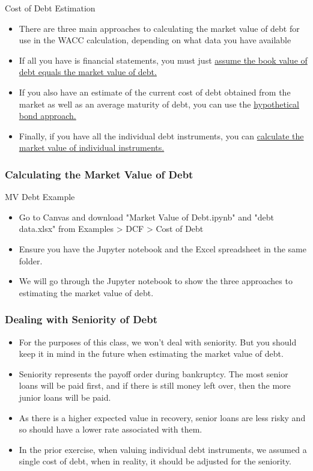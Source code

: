 \documentclass[handout, 11pt]{beamer}
\begin{document}
\begin{section}[Debt]{Cost of Debt Estimation}
\begin{frame}
\begin{itemize}
\item There are three main approaches to calculating the market value of debt for use in the WACC calculation, depending on what data you have available
\vfill
\item If all you have is financial statements, you must just
\underline{assume the book value of debt equals the market value of debt.}
\vfill
\item If you also have an estimate of the current cost of debt obtained from the market as well as an average maturity of debt, you can use the
\underline{hypothetical bond approach.}
\vfill
\item Finally, if you have all the individual debt instruments, you can
\underline{calculate the market value of individual instruments.}
\end{itemize}
\end{frame}
\begin{frame}
\frametitle{Calculating the Market Value of Debt}
{
\begin{block}{MV Debt Example}
\begin{itemize}
\item Go to Canvas and download "Market Value of Debt.ipynb" and "debt data.xlsx" from Examples > DCF > Cost of Debt
\item Ensure you have the Jupyter notebook and the Excel spreadsheet in the same folder.
\item We will go through the Jupyter notebook to show the three approaches to estimating the market value of debt.
\end{itemize}
\end{block}
}
\end{frame}
\begin{frame}
\frametitle{Dealing with Seniority of Debt}
\begin{itemize}
\item For the purposes of this class, we won't deal with seniority. But you should keep it in mind in the future when estimating the market value of debt.
\vfill
\item Seniority represents the payoff order during bankruptcy. The most senior loans will be paid first, and if there is still money left over, then the more junior loans will be paid.
\vfill
\item As there is a higher expected value in recovery, senior loans are less risky and so should have a lower rate associated with them.
\vfill
\item In the prior exercise, when valuing individual debt instruments, we assumed a single cost of debt, when in reality, it should be adjusted for the seniority.
\end{itemize}
\end{frame}
\end{section}
\end{document}

